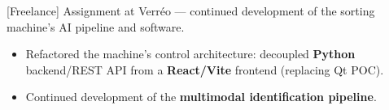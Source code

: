 [Freelance]
Assignment at Verréo — continued development of the sorting machine's AI pipeline and software.
\begin{itemize}
\item Refactored the machine's control architecture: decoupled \textbf{Python} backend/REST API from a \textbf{React/Vite} frontend (replacing Qt POC).
\item Continued development of the \textbf{multimodal identification pipeline}.
\end{itemize}
\vspace{-0.5em}
{\LaTeXraggedright
{}
\par}
